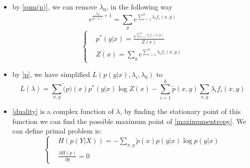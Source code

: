 \begin{frame}
	\begin{scriptsize}
		\begin{itemize}
			\item by \ref{sum(p)}, we can remove $\lambda_0$, in the following way 
				\begin{equation}
					e^{\frac{\lambda_0}{\widetilde{p}(x)}+1}=\sum_{y}e^{\sum_{i=1}^{k}\lambda_if_i(x,y)}
				\end{equation}
				\begin{equation}\label{p}
					\left\{
						\begin{aligned}
					 	&p^*(y|x)=\frac{e^{\sum_{i=1}^{k}\lambda_if_i(x,y)}}{Z(x)}\\
						&Z(x)=\sum_{y}e^{\sum_{i=1}^{k}\lambda_if_i(x,y)}
						\end{aligned}
					\right.
				\end{equation}
				\item by \ref{p}, we have simplified $L(p(y|x),\lambda_i,\lambda_0)$ to
				\begin{equation}\label{duality}
					L(\lambda)=\sum_{x,y}\widetilde(p)(x)p^*(y|x)\log Z(x)-\sum_{i=1}^k\widetilde{p}(x,y)\sum_{x,y}\lambda_if_i(x,y)
				\end{equation}
				\item \ref{duality} is a complex function of $\lambda$, by finding the stationary point of this function we can find the possible maximum point of \ref{maximumentropy}. We can define primal problem is:
				\begin{equation}\label{primal}
					\left\{
						\begin{aligned}
							&H(p(Y|X))=-\sum_{x,y}\widetilde{p}(x)p(y|x)\log p(y|x)\\
							&\frac{\partial{H(p)}}{\partial{p}}=0
						\end{aligned}
					\right.
				\end{equation}
		\end{itemize}
	\end{scriptsize}
\end{frame}
